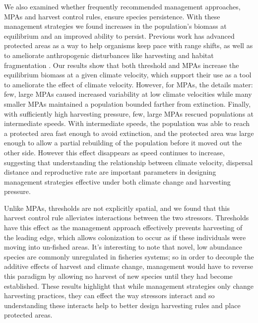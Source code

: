 \documentclass[12pt,english]{article}
\begin{document}
\begin{spacing}{1.9}
\begin{flushleft}
We also examined whether frequently recommended management approaches, MPAs and harvest control rules, ensure species persistence. With these management strategies we found increases in the population's biomass at equilibrium and an improved ability to persist. Previous work has advanced protected areas as a way to help organisms keep pace with range shifts, as well as to ameliorate anthropogenic disturbances like harvesting and habitat fragmentation \citep{Lawleretal2010, Hannahetal2007,Botsfordetal2001, Gaylordetal2005, HastingsBotsford2003,Thomasetal2012}. Our results show that both threshold and MPAs increase the equilibrium biomass at a given climate velocity, which support their use as a tool to ameliorate the effect of climate velocity. However, for MPAs, the details mater: few, large MPAs caused increased variability at low climate velocities while many smaller MPAs maintained a population bounded farther from extinction. Finally, with sufficiently high harvesting pressure, few, large MPAs rescued populations at intermediate speeds. With intermediate speeds, the population was able to reach a protected area fast enough to avoid extinction, and the protected area was large enough to allow a partial rebuilding of the population before it moved out the other side. However this effect disappears as speed continues to increase, suggesting that understanding the relationship between climate velocity, dispersal distance and reproductive rate are important parameters in designing management strategies effective under both climate change and harvesting pressure. 

Unlike MPAs, thresholds are not explicitly spatial, and we found that this harvest control rule alleviates interactions between the two stressors. Thresholds have this effect as the management approach effectively prevents harvesting of the leading edge, which allows colonization to occur as if these individuals were moving into un-fished areas. It's interesting to note that novel, low abundance species are commonly unregulated in fisheries systems; so in order to decouple the additive effects of harvest and climate change, management would have to reverse this paradigm by allowing no harvest of new species until they had become established. These results highlight that while management strategies only change harvesting practices, they can effect the way stressors interact and so understanding these interacts help to better design harvesting rules and place protected areas.


\end{flushleft}
\end{spacing}
\end{document}
